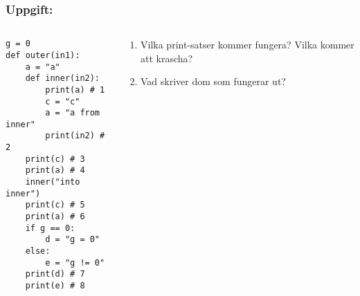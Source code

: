 \documentclass{beamer}
\begin{document}
  \begin{frame}[fragile]
    \frametitle{Uppgift: }
    \begin{columns}
      \begin{column}{0.48\textwidth}
        \begin{verbatim}
g = 0
def outer(in1):
    a = "a"
    def inner(in2):
        print(a) # 1
        c = "c"
        a = "a from inner"
        print(in2) # 2
    print(c) # 3
    print(a) # 4
    inner("into inner")
    print(c) # 5
    print(a) # 6
    if g == 0:
        d = "g = 0"
    else:
        e = "g != 0"
    print(d) # 7
    print(e) # 8
        \end{verbatim}
      \end{column}%
      \begin{column}{0.48\textwidth}
        \begin{enumerate}
          \item Vilka print-satser kommer fungera? Vilka kommer att krascha?
          \item Vad skriver dom som fungerar ut?
        \end{enumerate}
      \end{column}%
    \end{columns}
  \end{frame}
\end{document}
